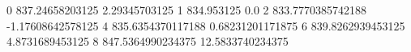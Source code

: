 0 837.24658203125 2.29345703125
1 834.953125 0.0
2 833.7770385742188 -1.17608642578125
4 835.6354370117188 0.68231201171875
6 839.8262939453125 4.8731689453125
8 847.5364990234375 12.5833740234375
